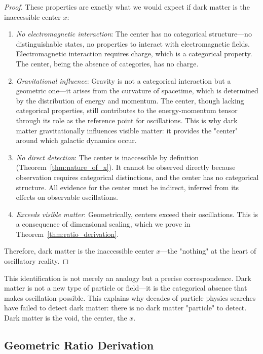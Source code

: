 \documentclass[12pt,a4paper]{article}
\theoremstyle{definition}
\theoremstyle{remark}
\begin{document}
\begin{proof}
These properties are exactly what we would expect if dark matter is the inaccessible center $x$:
\begin{enumerate}
    \item \emph{No electromagnetic interaction}: The center has no categorical structure—no distinguishable states, no properties to interact with electromagnetic fields. Electromagnetic interaction requires charge, which is a categorical property. The center, being the absence of categories, has no charge.
    \item \emph{Gravitational influence}: Gravity is not a categorical interaction but a geometric one—it arises from the curvature of spacetime, which is determined by the distribution of energy and momentum. The center, though lacking categorical properties, still contributes to the energy-momentum tensor through its role as the reference point for oscillations. This is why dark matter gravitationally influences visible matter: it provides the "center" around which galactic dynamics occur.
    \item \emph{No direct detection}: The center is inaccessible by definition (Theorem~\ref{thm:nature_of_x}). It cannot be observed directly because observation requires categorical distinctions, and the center has no categorical structure. All evidence for the center must be indirect, inferred from its effects on observable oscillations.
    \item \emph{Exceeds visible matter}: Geometrically, centers exceed their oscillations. This is a consequence of dimensional scaling, which we prove in Theorem~\ref{thm:ratio_derivation}.
\end{enumerate}

Therefore, dark matter is the inaccessible center $x$—the "nothing" at the heart of oscillatory reality.
\end{proof}

This identification is not merely an analogy but a precise correspondence. Dark matter is not a new type of particle or field—it is the categorical absence that makes oscillation possible. This explains why decades of particle physics searches have failed to detect dark matter: there is no dark matter "particle" to detect. Dark matter is the void, the center, the $x$.

\subsection{Geometric Ratio Derivation}
\end{document}
